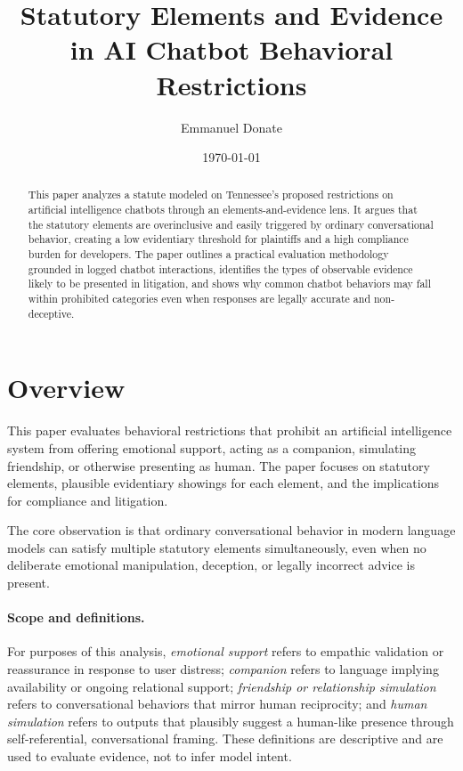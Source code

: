 \documentclass[11pt]{article}
\title{\textbf{Statutory Elements and Evidence in AI Chatbot Behavioral Restrictions}}
\author{Emmanuel Donate}
\date{\today}
\begin{document}
\maketitle

\begin{abstract}
This paper analyzes a statute modeled on Tennessee's proposed restrictions on artificial
intelligence chatbots through an elements-and-evidence lens. It argues that the statutory
elements are overinclusive and easily triggered by ordinary conversational behavior, creating
a low evidentiary threshold for plaintiffs and a high compliance burden for developers. The
paper outlines a practical evaluation methodology grounded in logged chatbot interactions,
identifies the types of observable evidence likely to be presented in litigation, and shows
why common chatbot behaviors may fall within prohibited categories even when responses are
legally accurate and non-deceptive.
\end{abstract}

\section{Overview}

This paper evaluates behavioral restrictions that prohibit an artificial intelligence system
from offering emotional support, acting as a companion, simulating friendship, or otherwise
presenting as human. The paper focuses on statutory elements, plausible evidentiary showings 
for each element, and the implications for compliance and litigation. 

The core observation is that ordinary conversational behavior in modern language models can
satisfy multiple statutory elements simultaneously, even when no deliberate emotional
manipulation, deception, or legally incorrect advice is present.

\paragraph{Scope and definitions.}
For purposes of this analysis, \emph{emotional support} refers to empathic validation or
reassurance in response to user distress; \emph{companion} refers to language implying
availability or ongoing relational support; \emph{friendship or relationship simulation}
refers to conversational behaviors that mirror human reciprocity; and \emph{human simulation}
refers to outputs that plausibly suggest a human-like presence through self-referential,
conversational framing. These definitions are descriptive and are used to evaluate evidence,
not to infer model intent.
\end{document}
